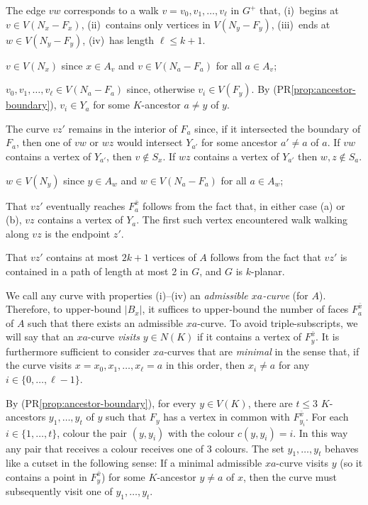 \documentclass{patmorin}
\renewcommand{\propref}[1]{(PR\ref{prop:#1})}
\begin{document}
The edge $vw$ corresponds to a walk $v=v_0,v_1,\ldots,v_{\ell}$ in $G^+$ that,
(i)~begins at $v\in V(N_x-F_x)$, (ii)~contains only vertices in $V(N_y-F_y)$, (iii)~ends at $w\in V(N_y-F_y)$, (iv)~has length $\ell\le k+1$.
\begin{compactenum}[(i)]
  \item $v\in V(N_x)$ since $x\in A_v$ and $v\in V(N_a-F_a)$ for all $a\in A_v$;
  
  \item $v_0,v_1,\ldots,v_{\ell}\in V(N_a-F_a)$ since, otherwise $v_i\in V(F_y)$.  By \propref{ancestor-boundary}, $v_i\in Y_{a}$ for some $K$-ancestor $a\neq y$ of $y$.  
  
  The curve $vz'$ remains in the interior of $F_a$ since, if it intersected the boundary of $F_a$, then one of $vw$ or $wz$ would intersect $Y_{a'}$ for some ancestor $a'\neq a$ of $a$.  If $vw$ contains a vertex of $Y_{a'}$, then $v\not\in S_x$.  If $wz$ contains a vertex of $Y_{a'}$ then $w,z\not\in S_a$. 

  \item $w\in V(N_y)$ since $y\in A_w$ and $w\in V(N_a-F_a)$ for all $a\in A_w$;

  \item That $vz'$ eventually reaches $F^{\bar{x}}_a$ follows from the fact that, in either case (a) or (b), $vz$ contains a vertex of $Y_a$.  The first such vertex encountered walk walking along $vz$ is the endpoint $z'$.
  
  \item That $vz'$ contains at most $2k+1$ vertices of $A$ follows from the fact that $vz'$ is contained in a path of length at most 2 in $G$, and $G$ is $k$-planar.
\end{compactenum}
We call any curve with properties (i)--(iv) an \emph{admissible $xa$-curve} (for $A$).  Therefore, to upper-bound $|B_x|$, it suffices to upper-bound the number of faces $F^{\bar{x}}_a$ of $A$ such that there exists an admissible $xa$-curve. To avoid triple-subscripts, we will say that an $xa$-curve \emph{visits} $y\in N(K)$ if it contains a vertex of $F^{\bar{x}}_y$.  It is furthermore sufficient to consider $xa$-curves that are \emph{minimal} in the sense that, if the curve visits $x=x_0,x_1,\ldots,x_\ell=a$ in this order, then $x_i\neq a$ for any $i\in\{0,\ldots,\ell-1\}$.

By \propref{ancestor-boundary}, for every $y\in V(K)$, there are $t\le 3$ $K$-ancestors $y_1,\ldots,y_t$ of $y$ such that $F_y$ has a vertex in common with $F^{\bar{x}}_{y_i}$. For each $i\in\{1,\ldots,t\}$, colour the pair $(y,y_i)$ with the colour $c(y,y_i)=i$. In this way any pair that receives a colour receives one of 3 colours.  The set $y_1,\ldots,y_t$ behaves like a cutset in the following sense:  If a minimal admissible $xa$-curve visits $y$ (so it contains a point in $F^{\bar{x}}_y$) for some $K$-ancestor $y\neq a$ of $x$, then the curve must subsequently visit one of $y_1,\ldots,y_t$.
\end{document}
